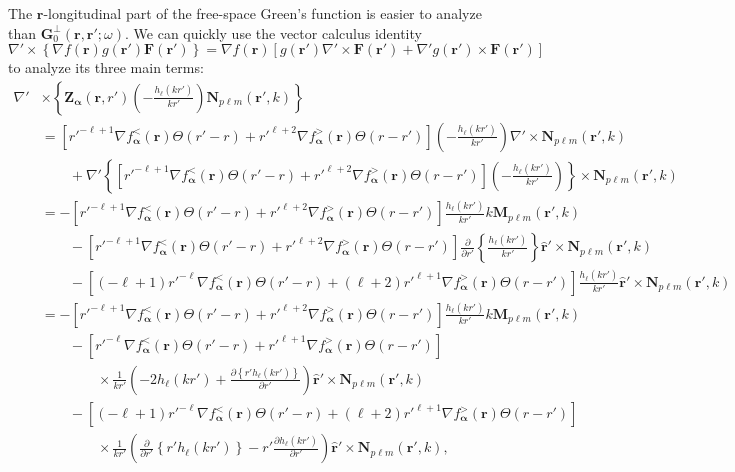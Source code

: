 The $\mathbf{r}$-longitudinal part of the free-space Green's function is easier to analyze than $\mathbf{G}_0^\perp(\mathbf{r},\mathbf{r}';\omega)$. We can quickly use the vector calculus identity $\nabla'\times\left\{\nabla f(\mathbf{r})g(\mathbf{r}')\mathbf{F}(\mathbf{r}')\right\} = \nabla f(\mathbf{r})\left[g(\mathbf{r}')\nabla'\times\mathbf{F}(\mathbf{r}') + \nabla'g(\mathbf{r}')\times\mathbf{F}(\mathbf{r}')\right]$ to analyze its three main terms:
\begin{equation}
\begin{split}
\nabla'&\times\left\{\mathbf{Z}_{\bm{\alpha}}(\mathbf{r},r')\left(-\frac{h_\ell(kr')}{kr'}\right)\mathbf{N}_{p\ell m}(\mathbf{r}',k)\right\}\\
&= \left[r'^{-\ell + 1}\nabla f_{\bm{\alpha}}^<(\mathbf{r})\Theta(r' - r) + r'^{\ell + 2}\nabla f_{\bm{\alpha}}^>(\mathbf{r})\Theta(r - r')\right]\left(-\frac{h_\ell(kr')}{kr'}\right)\nabla'\times\mathbf{N}_{p\ell m}(\mathbf{r}',k)\\
&\qquad+ \nabla'\left\{\left[r'^{-\ell + 1}\nabla f_{\bm{\alpha}}^<(\mathbf{r})\Theta(r' - r) + r'^{\ell + 2}\nabla f_{\bm{\alpha}}^>(\mathbf{r})\Theta(r - r')\right]\left(-\frac{h_\ell(kr')}{kr'}\right)\right\}\times\mathbf{N}_{p\ell m}(\mathbf{r}',k)\\
&= -\left[r'^{-\ell + 1}\nabla f_{\bm{\alpha}}^<(\mathbf{r})\Theta(r' - r) + r'^{\ell + 2}\nabla f_{\bm{\alpha}}^>(\mathbf{r})\Theta(r - r')\right]\frac{h_\ell(kr')}{kr'}k\mathbf{M}_{p\ell m}(\mathbf{r}',k)\\
&\qquad - \left[r'^{-\ell + 1}\nabla f_{\bm{\alpha}}^<(\mathbf{r})\Theta(r' - r) + r'^{\ell + 2}\nabla f_{\bm{\alpha}}^>(\mathbf{r})\Theta(r - r')\right]\frac{\partial}{\partial r'}\left\{\frac{h_\ell(kr')}{kr'}\right\}\hat{\mathbf{r}}'\times\mathbf{N}_{p\ell m}(\mathbf{r}',k)\\
&\qquad - \left[(-\ell + 1)r'^{-\ell}\nabla f_{\bm{\alpha}}^<(\mathbf{r})\Theta(r' - r) + (\ell + 2)r'^{\ell + 1}\nabla f_{\bm{\alpha}}^>(\mathbf{r})\Theta(r - r')\right]\frac{h_\ell(kr')}{kr'}\hat{\mathbf{r}}'\times\mathbf{N}_{p\ell m}(\mathbf{r}',k)\\
&= -\left[r'^{-\ell + 1}\nabla f_{\bm{\alpha}}^<(\mathbf{r})\Theta(r' - r) + r'^{\ell + 2}\nabla f_{\bm{\alpha}}^>(\mathbf{r})\Theta(r - r')\right]\frac{h_\ell(kr')}{kr'}k\mathbf{M}_{p\ell m}(\mathbf{r}',k)\\
&\qquad - \left[r'^{-\ell}\nabla f_{\bm{\alpha}}^<(\mathbf{r})\Theta(r' - r) + r'^{\ell + 1}\nabla f_{\bm{\alpha}}^>(\mathbf{r})\Theta(r - r')\right]\\
&\qquad\qquad\times\frac{1}{kr'}\left(-2h_\ell(kr') + \frac{\partial\left\{r'h_\ell(kr')\right\}}{\partial r'}\right)\hat{\mathbf{r}}'\times\mathbf{N}_{p\ell m}(\mathbf{r}',k)\\
&\qquad - \left[(-\ell + 1)r'^{-\ell}\nabla f_{\bm{\alpha}}^<(\mathbf{r})\Theta(r' - r) + (\ell + 2)r'^{\ell + 1}\nabla f_{\bm{\alpha}}^>(\mathbf{r})\Theta(r - r')\right]\\
&\qquad\qquad\times\frac{1}{kr'}\left(\frac{\partial}{\partial r'}\left\{r'h_\ell(kr')\right\} - r'\frac{\partial h_\ell(kr')}{\partial r'}\right)\hat{\mathbf{r}}'\times\mathbf{N}_{p\ell m}(\mathbf{r}',k),
\end{split}
\end{equation}
